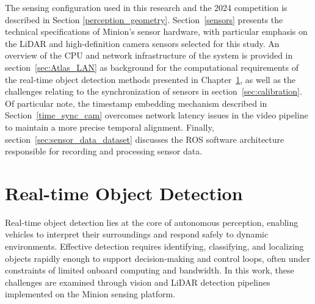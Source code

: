 \documentclass{erauthesis}
\begin{document}
The sensing configuration used in this research and the 2024 competition is described in Section \ref{perception_geometry}.
Section~\ref{sensors} presents the technical specifications of Minion's sensor hardware, with particular emphasis on the \ac{LiDAR} and high-definition camera sensors selected for this study.
An overview of the CPU and network infrastructure of the system is provided in section~\ref{sec:Atlas_LAN} as background for the computational requirements of the real-time object detection methods presented in Chapter~\ref{realtime_object_detection}, as well as the challenges relating to the synchronization of sensors in section~\ref{sec:calibration}.
Of particular note, the timestamp embedding mechanism described in Section~\ref{time_sync_cam} overcomes network latency issues in the video pipeline to maintain a more precise temporal alignment.
Finally, section~\ref{sec:sensor_data_dataset} discusses the \ac{ROS} software architecture responsible for recording and processing sensor data.








\chapter{Real-time Object Detection} \label{realtime_object_detection}


Real-time object detection lies at the core of autonomous perception, enabling vehicles to interpret their surroundings and respond safely to dynamic environments.
Effective detection requires identifying, classifying, and localizing objects rapidly enough to support decision-making and control loops, often under constraints of limited onboard computing and bandwidth.
In this work, these challenges are examined through vision and LiDAR detection pipelines implemented on the Minion sensing platform.
\end{document}
